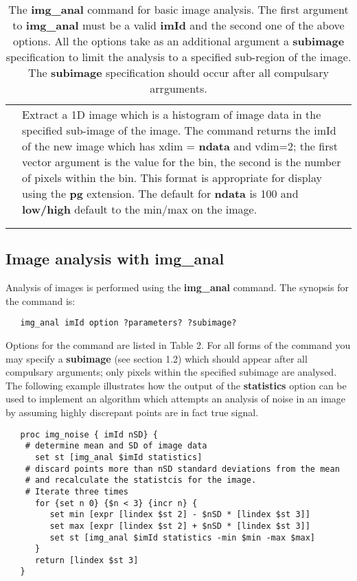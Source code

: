\begin{table}
\begin{tabular}{|l||l|}
\begin{minipage}[t]{4.0cm}
\end{minipage} &
\begin{minipage}[t]{11.0cm}
Extract a 1D image which is a histogram of image data in the specified 
sub-image of the image. The command returns the imId of the new image 
which has xdim = {\bf ndata} and vdim=2; the first vector argument is 
the value for the bin,
the second is the number of pixels within the bin.  This format is appropriate
for display using the {\bf pg} extension. The default for {\bf ndata} 
is 100 and {\bf low/high} default to the min/max on the image.
\end{minipage} \\
& \\ 
& \\ \hline
\end{tabular}
\caption{The {\bf img\_anal} command for basic image analysis.  
The first argument to
{\bf img\_anal} must be a valid {\bf imId} and the second one of the above 
options.  All the options take as an additional argument a {\bf subimage}
specification to limit the analysis to a specified sub-region of the
image.  The {\bf subimage} specification should occur after all
compulsary arrguments.}
\end{table}

\subsection{Image analysis with img\_anal}

Analysis of images is performed using the {\bf img\_anal} command.
The synopsis for the command is:
\begin{verbatim}
   img_anal imId option ?parameters? ?subimage?
\end{verbatim}
Options for the command are listed in Table 2.  For all forms of the command
you may specify a {\bf subimage} (see section 1.2) which should appear
after all compulsary arguments; only pixels within the specified subimage
are analysed.
The following example illustrates how the output of the {\bf statistics}
option can be used to implement an algorithm which attempts an
analysis of noise in an image by assuming highly discrepant points are in
fact true signal.
\begin{verbatim}
   proc img_noise { imId nSD} {
    # determine mean and SD of image data
      set st [img_anal $imId statistics]
    # discard points more than nSD standard deviations from the mean 
    # and recalculate the statistcis for the image.
    # Iterate three times
      for {set n 0} {$n < 3} {incr n} {
         set min [expr [lindex $st 2] - $nSD * [lindex $st 3]]
         set max [expr [lindex $st 2] + $nSD * [lindex $st 3]]
         set st [img_anal $imId statistics -min $min -max $max]
      }
      return [lindex $st 3]
   }
\end{verbatim}

